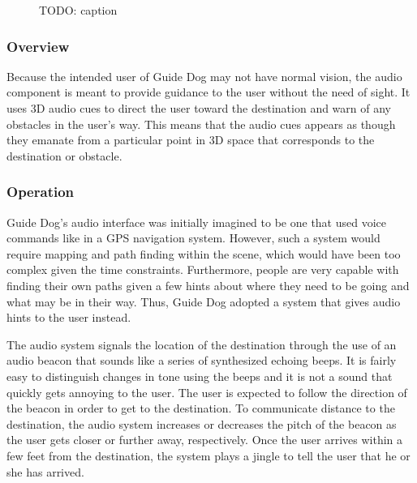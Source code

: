 \begin{figure}
\caption{TODO: caption}
\label{fig:vsim}
\end{figure}

\subsubsection{Overview}
\label{sec:technical-audio-overview}

Because the intended user of Guide Dog may not have normal vision, the audio 
component is meant to provide guidance to the user without the need of sight. It
uses 3D audio cues to direct the user toward the destination and warn of any 
obstacles in the user's way. This means that the audio cues appears as though
they emanate from a particular point in 3D space that corresponds to the
destination or obstacle.

\subsubsection{Operation}
\label{sec:technical-audio-op}

Guide Dog's audio interface was initially imagined to be one that used voice 
commands like in a GPS navigation system. However, such a system would require
mapping and path finding within the scene, which would have been too complex
given the time constraints. Furthermore, people are very capable with finding
their own paths given a few hints about where they need to be going and what
may be in their way. Thus, Guide Dog adopted a system that gives audio hints to
the user instead.

The audio system signals the location of the destination through the use of an
audio beacon that sounds like a series of synthesized echoing beeps. It is fairly
easy to distinguish changes in tone using the beeps and it is not a sound that
quickly gets annoying to the user. The user is expected to follow the direction
of the beacon in order to get to the destination. To communicate distance to the
destination, the audio system increases or decreases the pitch of the beacon as 
the user gets closer or further away, respectively. Once the user arrives within
a few feet from the destination, the system plays a jingle to tell the user that 
he or she has arrived. 

